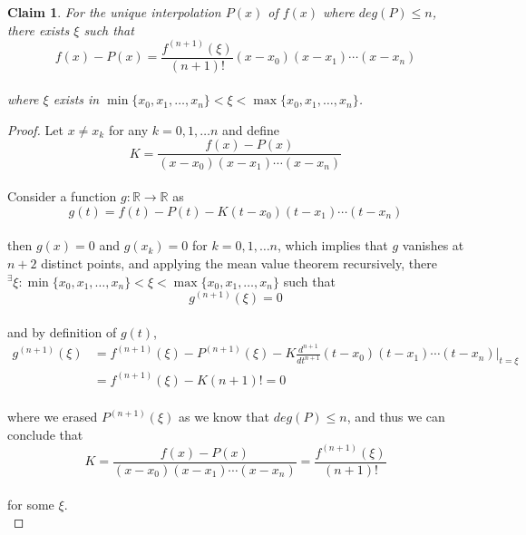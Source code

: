 \documentclass[paper=a4, fontsize=11pt]{scrartcl}
\newtheorem{claim}{Claim}
\begin{document}
\begin{claim}
For the unique interpolation $P(x)$ of $f(x)$ where $deg(P) \leq n$, there exists $\xi$ such that\\

\begin{equation}\nonumber
	f(x)-P(x) = \frac{f^{(n+1)}(\xi)}{(n+1)!} (x-x_0)(x-x_1) \cdots (x-x_n)
\end{equation}\\

where $\xi$ exists in $\min\{x_0, x_1, \dots , x_n\} < \xi < \max\{ x_0, x_1, \dots , x_n \}$.
\end{claim}

\begin{proof}
	Let $x \neq x_k$ for any $k=0,1,\dots n$ and define \\
	
	\begin{equation}\nonumber
		K = \frac{f(x)-P(x)}{(x-x_0)(x-x_1) \cdots (x-x_n)}
	\end{equation}\\
	
	Consider a function $g:\mathbb{R} \to \mathbb{R}$ as \\
	
	\begin{equation}\nonumber
		g(t) = f(t) - P(t) - K (t-x_0)(t-x_1) \cdots (t-x_n)
	\end{equation}\\
	
	then $g(x)=0$ and $g(x_k)=0$ for $k=0,1, \dots n$, which implies that $g$ vanishes at $n+2$ distinct points, and applying the mean value theorem recursively, there $^\exists \xi : \min\{x_0, x_1, \dots , x_n\} < \xi < \max\{ x_0, x_1, \dots , x_n \}$ such that \\
	
	\begin{equation}\nonumber
		g^{(n+1)}(\xi) = 0
	\end{equation}\\
	
	and by definition of $g(t)$,\\
	
	\begin{equation}\nonumber
	\begin{split}
		g^{(n+1)}(\xi) &= f^{(n+1)}(\xi) - P^{(n+1)}(\xi) - K \frac{d^{n+1}}{dt^{n+1}}(t-x_0)(t-x_1) \cdots (t-x_n) \Big|_{t = \xi} \\[2.5ex]
		&= f^{(n+1)}(\xi) - K (n+1)! =0
	\end{split}
	\end{equation}\\
	
	where we erased $P^{(n+1)}(\xi)$ as we know that $deg(P) \leq n$, and thus we can conclude that\\
	
	\begin{equation}\nonumber
	K = \frac{f(x)-P(x)}{(x-x_0)(x-x_1) \cdots (x-x_n)} = \frac{f^{(n+1)}(\xi) }{(n+1)!}
	\end{equation}\\
	
	for some $\xi$.\\
\end{proof}
\end{document}
